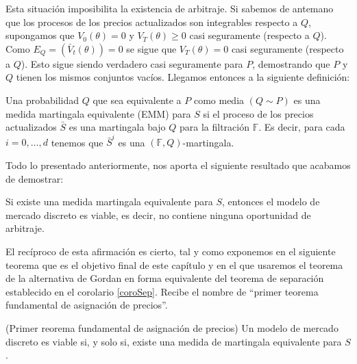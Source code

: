 Esta situación imposibilita la existencia de arbitraje. Si sabemos de antemano que los procesos de los precios actualizados son integrables respecto a $ Q $, supongamos que $ V_0 (\theta) = 0$ y $ V_T (\theta) \geq 0$ casi seguramente (respecto a $ Q $). Como $ E_Q = (\bar{V}_t ( \theta)) = 0 $ se sigue que $ V_T(\theta) = 0$ casi seguramente (respecto a $ Q $). Esto sigue siendo verdadero casi seguramente para $ P $, demostrando que $ P $ y $ Q $ tienen los mismos conjuntos vacíos. Llegamos entonces a la siguiente definición:
\bigskip
\begin{definicion}
	Una probabilidad $ Q $ que sea equivalente a $ P $ como media $ (Q\sim P) $ es una medida martingala equivalente (EMM) para $ S $ si el proceso de los precios actualizados $ \bar{S} $ es una martingala bajo $ Q $ para la filtración $ \mathbb{F} $. Es decir, para cada $ i =0,\dots, d $ tenemos que $ \bar{S}^i $ es una $ (\mathbb{F},Q) $-martingala.
\end{definicion}
\bigskip
Todo lo presentado anteriormente, nos aporta el siguiente resultado que acabamos de demostrar:
\bigskip
\begin{proposicionBox}\label{martThenViab}
	Si existe una medida martingala equivalente para $ S $, entonces el modelo de mercado discreto es viable, es decir, no contiene ninguna oportunidad de arbitraje.	
\end{proposicionBox}
\bigskip
El recíproco de esta afirmación es cierto, tal y como exponemos en el siguiente teorema que es el objetivo final de este capítulo y en el que usaremos el teorema de la alternativa de Gordan en forma equivalente del teorema de separación establecido en el corolario \ref{coroSep}. Recibe el nombre de ``primer teorema fundamental de asignación de precios''.
\bigskip
\begin{teoremaBox}(Primer reorema fundamental de asignación de precios)\label{VIABLEiofEMM}
	Un modelo de mercado discreto es viable si, y solo si, existe una medida de martingala equivalente para $ S $.
\end{teoremaBox}
